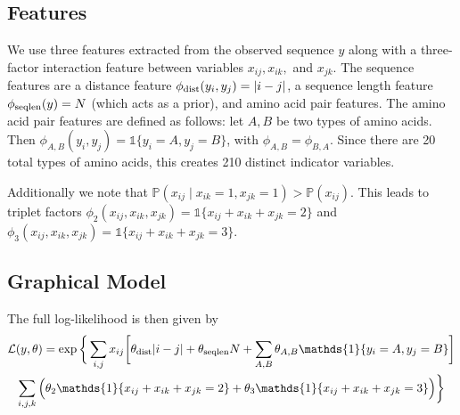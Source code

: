 \documentclass{article}
\begin{document}
\subsection{Features}
We use three features extracted from the observed sequence $y$ along with a three-factor interaction feature between variables $x_{ij}, x_{ik},$ and $x_{jk}$. The sequence features are a distance feature $\phi_{\textmd{dist}}(y_i, y_j) = |i - j|$, a sequence length feature $\phi_{\textmd{seqlen}}(y) = N$ (which acts as a prior), and amino acid pair features. The amino acid pair features are defined as follows: let $A, B$ be two types of amino acids. Then $\phi_{A, B}(y_i, y_j) = \mathds{1}\{y_i = A, y_j = B\}$, with $\phi_{A, B} = \phi_{B, A}$. Since there are 20 total types of amino acids, this creates 210 distinct indicator variables.

Additionally we note that $\mathbb{P}(x_{ij} \mid x_{ik} = 1, x_{jk} = 1) > \mathbb{P}(x_{ij})$. This leads to triplet factors $\phi_2(x_{ij}, x_{ik}, x_{jk}) = \mathds{1}\{x_{ij} + x_{ik} + x_{jk} = 2\}$ and $\phi_3(x_{ij}, x_{ik}, x_{jk}) = \mathds{1}\{x_{ij} + x_{ik} + x_{jk} = 3\}$. 
\subsection{Graphical Model}
The full log-likelihood is then given by
\begin{multline} \label{eq:likelihood}
\mathcal{L}(y, \theta) = \exp\bigg\{\sum_{i, j} x_{ij}\bigg[\theta_{\textmd{dist}}|i - j|+ \theta_{\textmd{seqlen}}N + \sum_{A, B} \theta_{A, B}\mathds{1}\{y_i = A, y_j = B\}\bigg] \\
\sum_{i, j, k}\Big(\theta_2\mathds{1}\{x_{ij} + x_{ik} + x_{jk} = 2\} + \theta_3\mathds{1}\{x_{ij} + x_{ik} + x_{jk} = 3\}\Big)\bigg\}
\end{multline}
\end{document}
